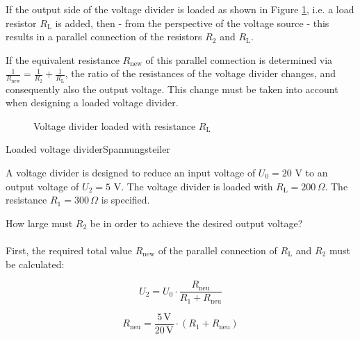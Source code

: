 \begin{frame}
{		If the output side of the voltage divider is loaded as shown in Figure \ref{fig:belspannungsteiler}, i.e. a load resistor $R_\mathrm{L}$ is added, then - from 
		the perspective of the voltage source - this results in a parallel connection of the resistors $R_2$ and $R_\mathrm{L}$.
                
		If the equivalent resistance $R_\mathrm{new}$ of this parallel connection is determined via 
        $\frac{1}{R_\mathrm{new}} = \frac{1}{R_2} + \frac{1}{R_\mathrm{L}}$, the ratio of the resistances of the voltage divider changes, 
        and consequently also the output voltage. This change must be taken into account when designing a loaded voltage divider.
		
		
		
		
		\begin{figure}[h!]
			\renewcommand{\figurename}{Figure}
			\begin{center}

				
				\caption{Voltage divider loaded with resistance $R_\mathrm{L}$}
				\label{fig:belspannungsteiler}
			\end{center}
		\end{figure}
		
		
		\begin{expl}{Loaded voltage divider}{Spannungsteiler}
			
			A voltage divider is designed to reduce an input voltage of $U_0 = 20$ V to an output voltage of $U_2 = 5$ V.
			The voltage divider is loaded with $R_\mathrm{L} = 200 \, \Omega$.
			The resistance $R_1 = 300 \, \Omega$ is specified.
			
			How large must $R_2$ be in order to achieve the desired output voltage?\\
			
			\phantom{.}\\
			
			
			First, the required total value $R_\mathrm{new}$ of the parallel connection of $R_\mathrm{L}$ and $R_2$ must be calculated:
			
			\begin{equation*}
				U_2 = U_0 \cdot \frac{R_\mathrm{neu}}{R_1+R_\mathrm{neu}}
			\end{equation*}
			
			\begin{equation*}
				R_\mathrm{neu} = \frac{5 \, \mathrm{V}}{20 \, \mathrm{V}} \cdot (R_1 + R_\mathrm{neu})
			\end{equation*}
			

\end{expl}}
\end{frame}
